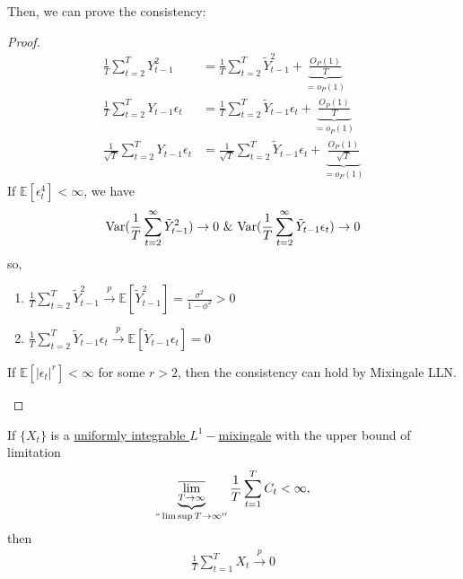 \documentclass[11pt]{elegantbook}
\begin{document}
Then, we can prove the consistency:
\begin{proof}
    \begin{equation}
        \begin{aligned}
            \frac{1}{T}\sum_{t=2}^T Y_{t-1}^2&=\frac{1}{T}\sum_{t=2}^T \tilde{Y}_{t-1}^2+\underbrace{\frac{O_P(1)}{T}}_{=o_P(1)}\\
            \frac{1}{T}\sum_{t=2}^T Y_{t-1}\epsilon_t&=\frac{1}{T}\sum_{t=2}^T \tilde{Y}_{t-1}\epsilon_t+\underbrace{\frac{O_P(1)}{T}}_{=o_P(1)}\\
            \frac{1}{\sqrt{T}}\sum_{t=2}^T Y_{t-1}\epsilon_t&=\frac{1}{\sqrt{T}}\sum_{t=2}^T \tilde{Y}_{t-1}\epsilon_t+\underbrace{\frac{O_P(1)}{\sqrt{T}}}_{=o_P(1)}
        \end{aligned}
        \nonumber
    \end{equation}
    If $\mathbb{E}[\epsilon_t^4]<\infty$, we have
    \begin{equation}
        \begin{aligned}
            \textnormal{Var}(\frac{1}{T}\sum_{t=2}^\infty\tilde{Y}_{t-1}^2) \rightarrow 0\ \& \ \textnormal{Var}(\frac{1}{T}\sum_{t=2}^\infty\tilde{Y}_{t-1}\epsilon_t) \rightarrow 0
        \end{aligned}
        \nonumber
    \end{equation}
    so,
    \begin{enumerate}
        \item $\frac{1}{T}\sum_{t=2}^T \tilde{Y}_{t-1}^2 \stackrel{p}{\longrightarrow} \mathbb{E}[\tilde{Y}_{t-1}^2]=\frac{\sigma^2}{1-\phi^2}>0$
        \item $\frac{1}{T}\sum_{t=2}^T \tilde{Y}_{t-1}\epsilon_t \stackrel{p}{\rightarrow} \mathbb{E}[\tilde{Y}_{t-1}\epsilon_t]=0$
    \end{enumerate}
    \begin{note}
        If $\mathbb{E}[|\epsilon_t|^r]<\infty$ for some $r>2$, then the consistency can hold by Mixingale LLN.
    \end{note}
\end{proof}
\begin{theorem}
    If $\{X_t\}$ is a \underline{uniformly integrable $L^1-$mixingale} with the upper bound of limitation
    \begin{equation}
        \begin{aligned}
            \underbrace{\overline{\lim_{T \rightarrow \infty}}}_{``\lim\sup T \rightarrow \infty''}\frac{1}{T}\sum_{t=1}^T C_t<\infty,
        \end{aligned}
        \nonumber
    \end{equation}
    then
    \begin{equation}
        \begin{aligned}
            \frac{1}{T}\sum_{t=1}^T X_t \stackrel{p}{\longrightarrow} 0
        \end{aligned}
        \nonumber
    \end{equation}
\end{theorem}
\end{document}

